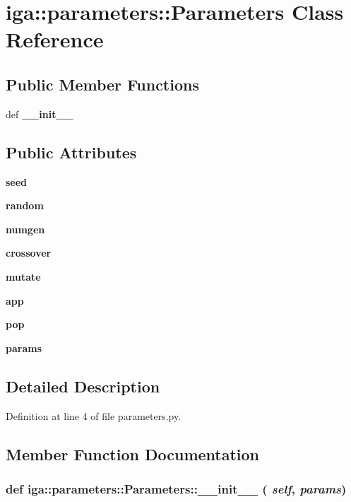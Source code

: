 \section{iga::parameters::Parameters Class Reference}
\label{classiga_1_1parameters_1_1Parameters}
\subsection*{Public Member Functions}
\begin{CompactItemize}
\item 
def {\bf \_\-\_\-init\_\-\_\-}
\end{CompactItemize}
\subsection*{Public Attributes}
\begin{CompactItemize}
\item 
{\bf seed}
\item 
{\bf random}
\item 
{\bf numgen}
\item 
{\bf crossover}
\item 
{\bf mutate}
\item 
{\bf app}
\item 
{\bf pop}
\item 
{\bf params}
\end{CompactItemize}


\subsection{Detailed Description}


Definition at line 4 of file parameters.py.

\subsection{Member Function Documentation}
\subsubsection{\setlength{\rightskip}{0pt plus 5cm}def iga::parameters::Parameters::\_\-\_\-init\_\-\_\- ( {\em self},  {\em params})}\label{classiga_1_1parameters_1_1Parameters_99221b2eb3bca1b08d8fe1c6b07a061a}




